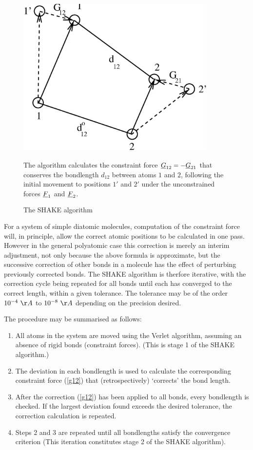 \begin{figure}[ht]
\begin{center}
\includegraphics[height=8cm]{shake.eps}
\caption{The SHAKE algorithm}
\end{center}
The algorithm calculates the constraint force
$\mbox{$\underline{G}$}_{12}=-\mbox{$\underline{G}$}_{21}$ that conserves the bondlength $d_{12}$
between atoms $1$ and $2$, following the initial movement to positions
$1'$ and $2'$ under the unconstrained forces $\mbox{$\underline{F}$}_{1}$ and $\mbox{$\underline{F}$}_{2}$.
\end{figure}

For a system of simple diatomic molecules, computation of the
constraint force will, in principle, allow the correct atomic
positions to be calculated in one pass.  However in the general
polyatomic case this correction is merely an interim adjustment, not
only because the above formula is approximate, but the successive
correction of other bonds in a molecule has the effect of perturbing
previously corrected bonds. The SHAKE algorithm is therfore iterative,
with the correction cycle being repeated for all bonds until each has
converged to the correct length, within a given tolerance.  The
tolerance may be of the order $10^{-4}~\AA$ to $10^{-8}~\AA$ depending
on the precision desired.

The procedure may be summarised as follows:
\begin{enumerate}
\item All atoms in the system are moved using the Verlet algorithm, 
assuming an absence of rigid bonds 
(constraint forces).  (This is
stage 1 of the SHAKE algorithm.)
\item The deviation in each bondlength is used to calculate the 
corresponding constraint force (\ref{g12}) that (retrospectively)
`corrects' the bond length.
\item After the correction (\ref{g12}) has been applied to all bonds, every
bondlength is checked. If the largest deviation found exceeds the
desired tolerance, the correction calculation is repeated.
\item Steps 2 and 3 are repeated until all bondlengths satisfy the 
convergence criterion (This iteration constitutes stage 2 of the SHAKE
algorithm).
\end{enumerate}

